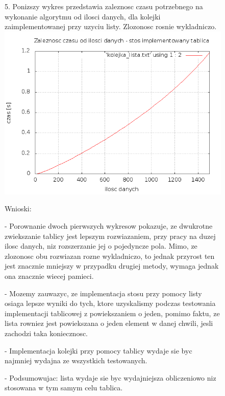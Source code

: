 \documentclass[a4paper,11pt]{report}
\begin{document}
\begin{figure}
  5. Ponizszy wykres przedstawia zaleznosc czasu potrzebnego na wykonanie algorytmu od ilosci danych, dla kolejki zaimplementowanej przy uzyciu listy. Zlozonosc rosnie wykladniczo.
    \includegraphics[scale=0.5]{./s_kolejka_lista.png}
\end{figure}

\begin{figure}
    Wnioski:
\end{figure}

\begin{figure}
    - Porownanie dwoch pierwszych wykresow pokazuje, ze dwukrotne zwiekszanie tablicy jest lepszym rozwiazaniem, przy pracy na duzej ilosc danych, niz rozszerzanie jej o pojedyncze pola. Mimo, ze zlozonosc obu rozwiazan rozne wykladniczo, to jednak przyrost ten jest znacznie mniejszy w przypadku drugiej metody, wymaga jednak ona znacznie wiecej pamieci.
\end{figure}

\begin{figure}
    - Mozemy zauwazyc, ze implementacja stosu przy pomocy listy osiaga lepsze wyniki do tych, ktore uzyskalismy podczas testowania implementacji tablicowej z powiekszaniem o jeden, pomimo faktu, ze lista rowniez jest powiekszana o jeden element w danej chwili, jesli zachodzi taka koniecznosc.
\end{figure}

\begin{figure}
    - Implementacja kolejki przy pomocy tablicy wydaje sie byc najmniej wydajna ze wszystkich testowanych.
\end{figure}

\begin{figure}
    - Podsumowujac: lista wydaje sie byc wydajniejsza obliczeniowo niz stosowana w tym samym celu tablica.
\end{figure}
\end{document}
